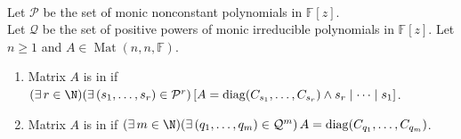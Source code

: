 \begin{definition} \label{def:rational-canonical-block-forms} \\
Let $\mathcal{P}$ be the set of monic nonconstant polynomials in $\mathbb{F}[z]$.\\
Let $\mathcal{Q}$ be the set of positive powers of monic irreducible polynomials in $\mathbb{F}[z]$. Let $n\geq1$ and $A\in\operatorname{Mat}(n,n,\mathbb{F})$.
\begin{enumerate}[label=(\roman*)]
\setlength{\itemsep}{0pt}
\item Matrix $A$ is in  if $(\exists\,r\in\N)(\exists\,(s_1,\ldots,s_r)\in\mathcal{P}^r)\,[A=\operatorname{diag}(C_{s_1},\ldots,C_{s_r})\land s_r\mid\cdots\mid s_1]$.
\item Matrix $A$ is in  if $(\exists\,m\in\N)(\exists\,(q_1,\ldots,q_m)\in\mathcal{Q}^m)\,A=\operatorname{diag}(C_{q_1},\ldots,C_{q_m})$.
\end{enumerate}
\end{definition}

